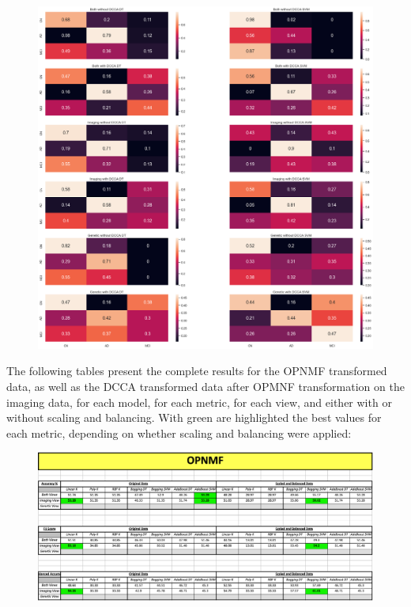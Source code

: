 {\begin{figure}[H]
    \centering
    \includegraphics[width=\textwidth]{figures/Results/NMF/AdaBoost_NMF_CM_with.png}
    \caption[]{}
    \label{fig:OPNMF AdaBoost Confusion Matrices with scaling and balancing}
\end{figure}

The following tables present the complete results for the OPNMF transformed data, as well as the DCCA transformed data after OPMNF transformation on the imaging data, for each model, for each metric, for each view, and either with or without scaling and balancing. With green are highlighted the best values for each metric, depending on whether scaling and balancing were applied:

\begin{figure} [H]
    \centering
    \includegraphics[width=\textwidth]{figures/Results/Analytical_Table_OPNMF.png}
    \caption[]{}
    \label{fig: Summary Table for classification scores for OPNMF transformed data}
\end{figure}

}
